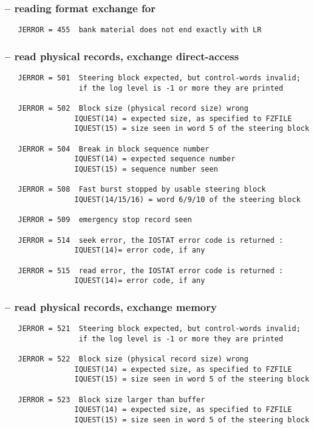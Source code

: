 \subsubsection*{ -- reading format exchange for }

\begin{verbatim}
   JERROR = 455  bank material does not end exactly with LR
\end{verbatim}

\subsubsection*{ -- read physical records, exchange direct-access}

\begin{verbatim}
   JERROR = 501  Steering block expected, but control-words invalid;
                 if the log level is -1 or more they are printed

   JERROR = 502  Block size (physical record size) wrong
                IQUEST(14) = expected size, as specified to FZFILE
                IQUEST(15) = size seen in word 5 of the steering block

   JERROR = 504  Break in block sequence number
                IQUEST(14) = expected sequence number
                IQUEST(15) = sequence number seen

   JERROR = 508  Fast burst stopped by usable steering block
                IQUEST(14/15/16) = word 6/9/10 of the steering block

   JERROR = 509  emergency stop record seen

   JERROR = 514  seek error, the IOSTAT error code is returned :
                IQUEST(14)= error code, if any

   JERROR = 515  read error, the IOSTAT error code is returned :
                IQUEST(14)= error code, if any
\end{verbatim}

\subsubsection*{ -- read physical records, exchange memory}

\begin{verbatim}
   JERROR = 521  Steering block expected, but control-words invalid;
                 if the log level is -1 or more they are printed

   JERROR = 522  Block size (physical record size) wrong
                IQUEST(14) = expected size, as specified to FZFILE
                IQUEST(15) = size seen in word 5 of the steering block

   JERROR = 523  Block size larger than buffer
                IQUEST(14) = expected size, as specified to FZFILE
                IQUEST(15) = size seen in word 5 of the steering block
\end{verbatim}

